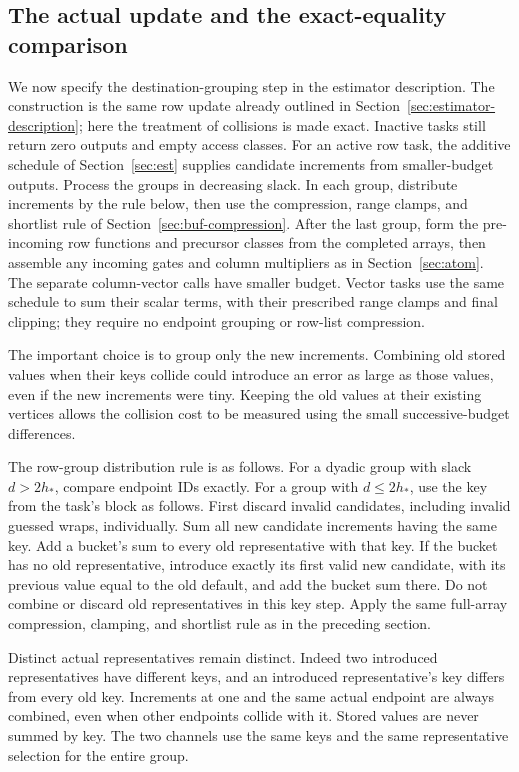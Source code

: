 \subsection{The actual update and the exact-equality comparison}

We now specify the destination-grouping step in the estimator description. The construction is the same row update already outlined in Section~\ref{sec:estimator-description}; here the treatment of collisions is made exact. Inactive tasks still return zero outputs and empty access classes.  For an active
row task, the additive schedule of Section~\ref{sec:est} supplies
candidate increments from smaller-budget outputs.  Process the groups in
decreasing slack.  In each group, distribute increments by the rule below,
then use the compression, range clamps, and shortlist rule of
Section~\ref{sec:buf-compression}.  After the last group, form the
pre-incoming row functions and precursor classes from the completed arrays,
then assemble any incoming gates and column multipliers as in
Section~\ref{sec:atom}.  The separate column-vector calls have smaller
budget.  Vector tasks use the same schedule to sum their scalar terms,
with their prescribed range clamps and final clipping; they require no
endpoint grouping or row-list compression.

The important choice is to group only the new increments. Combining old stored values when their keys collide could introduce an error as large as those values, even if the new increments were tiny. Keeping the old values at their existing vertices allows the collision cost to be measured using the small successive-budget differences.

The row-group distribution rule is as follows.
For a dyadic group with slack $d>2h_*$, compare endpoint IDs exactly.  For a
group with $d\le2h_*$, use the key from the task's block as follows.
First discard invalid candidates, including invalid guessed wraps,
individually.  Sum all new candidate increments having the same key.
Add a bucket's sum to every old representative with that key.  If the
bucket has no old representative, introduce exactly its first valid new
candidate, with its previous value equal to the old default, and add the
bucket sum there.  Do not combine or discard old representatives in this
key step.  Apply the same full-array compression, clamping, and shortlist
rule as in the preceding section.

Distinct actual representatives remain distinct.  Indeed two introduced
representatives have different keys, and an introduced representative's
key differs from every old key.  Increments at one and the same actual
endpoint are always combined, even when other endpoints collide with it.
Stored values are never summed by key.  The two channels use the same keys
and the same representative selection for the entire group.

